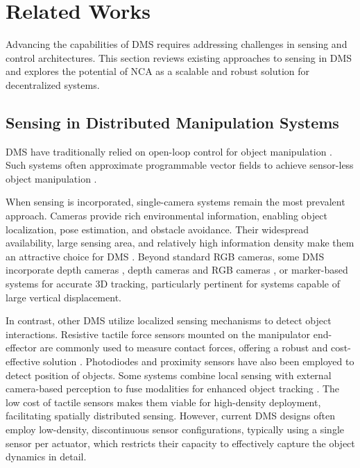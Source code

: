 \section{Related Works}

Advancing the capabilities of \ac{DMS} requires addressing challenges in sensing and control architectures. This section reviews existing approaches to sensing in \ac{DMS} and explores the potential of \ac{NCA} as a scalable and robust solution for decentralized systems.

\subsection{Sensing in Distributed Manipulation Systems}

\ac{DMS} have traditionally relied on open-loop control for object manipulation \cite{bohringer_sensorless_1995, georgilas_cellular_2015, liu_robotic_2021, liu_micromachined_1995}. Such systems often approximate programmable vector fields to achieve sensor-less object manipulation \cite{bohringer_theory_1994, bohringer_part_2000, patil_linear_2023}.


When sensing is incorporated, single-camera systems remain the most prevalent approach. Cameras provide rich environmental information, enabling object localization, pose estimation, and obstacle avoidance.
Their widespread availability, large sensing area, and relatively high information density make them an attractive choice for \ac{DMS} \cite{reznik_cmon_2001, ataka_design_2009, georgilas_cellular_2015}. Beyond standard RGB cameras, some \ac{DMS} incorporate depth cameras \cite{follmer_inform_2013}, depth cameras and RGB cameras \cite{uriarte_control_2019}, or marker-based systems \cite{xu_modular_2024} for accurate 3D tracking, particularly pertinent for systems capable of large vertical displacement. %

In contrast, other \ac{DMS} utilize localized sensing mechanisms to detect object interactions. Resistive tactile force sensors mounted on the manipulator end-effector are commonly used to measure contact forces, offering a robust and cost-effective solution \cite{robertson_compact_2019, xue_arraybot_2023}. 
Photodiodes \cite{berlin_motion_2000, ataka_layer-built_2007, bedillion_distributed_2013} and proximity sensors \cite{fukuda_hybrid_2000} have also been employed to detect position of objects.  Some systems combine local sensing with external camera-based perception to fuse modalities for enhanced object tracking \cite{parajuli_actuator_2014}. The low cost of tactile sensors makes them viable for high-density deployment, facilitating spatially distributed sensing. %
However, current \ac{DMS} designs often employ low-density, discontinuous sensor configurations, typically using a single sensor per actuator, which restricts their capacity to effectively capture the object dynamics in detail.



